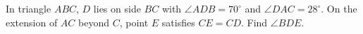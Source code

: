In triangle $ABC$, $D$ lies on side $BC$ with $\angle ADB=70^\circ$ and $\angle DAC=28^\circ$. On the extension of $AC$ beyond $C$, point $E$ satisfies $CE=CD$. Find $\angle BDE$.
